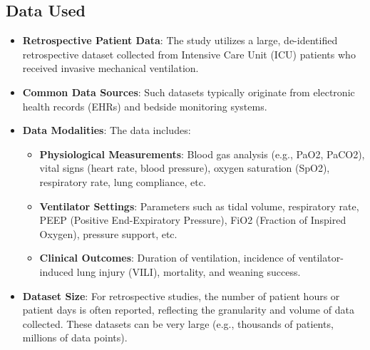 \subsection*{Data Used}
\begin{itemize}
    \item \textbf{Retrospective Patient Data}: The study utilizes a large, de-identified retrospective dataset collected from Intensive Care Unit (ICU) patients who received invasive mechanical ventilation.
    \item \textbf{Common Data Sources}: Such datasets typically originate from electronic health records (EHRs) and bedside monitoring systems.
    \item \textbf{Data Modalities}: The data includes:
    \begin{itemize}
        \item \textbf{Physiological Measurements}: Blood gas analysis (e.g., PaO2, PaCO2), vital signs (heart rate, blood pressure), oxygen saturation (SpO2), respiratory rate, lung compliance, etc.
        \item \textbf{Ventilator Settings}: Parameters such as tidal volume, respiratory rate, PEEP (Positive End-Expiratory Pressure), FiO2 (Fraction of Inspired Oxygen), pressure support, etc.
        \item \textbf{Clinical Outcomes}: Duration of ventilation, incidence of ventilator-induced lung injury (VILI), mortality, and weaning success.
    \end{itemize}
    \item \textbf{Dataset Size}: For retrospective studies, the number of patient hours or patient days is often reported, reflecting the granularity and volume of data collected. These datasets can be very large (e.g., thousands of patients, millions of data points).
\end{itemize}


